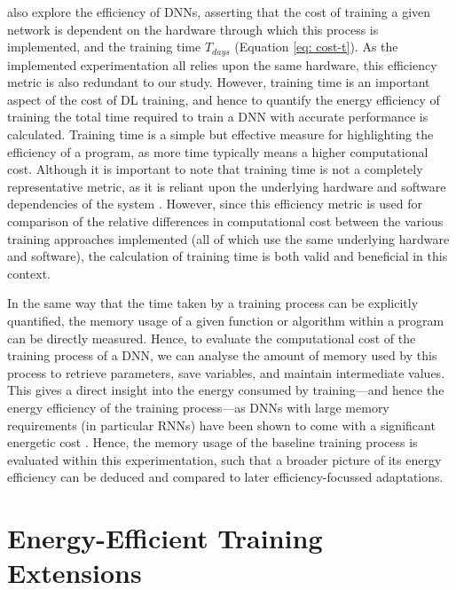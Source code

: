 \documentclass[a4paper, 11pt]{report}
\begin{document}
    \citet{amodei-2018} also explore the efficiency of DNNs, asserting that the cost of training a given network is dependent on the hardware through which this process is implemented, and the training time $T_{days}$ (Equation \ref{eq: cost-t}). As the implemented experimentation all relies upon the same hardware, this efficiency metric is also redundant to our study. However, training time is an important aspect of the cost of DL training, and hence to quantify the energy efficiency of training the total time required to train a DNN with accurate performance is calculated. Training time is a simple but effective measure for highlighting the efficiency of a program, as more time typically means a higher computational cost. Although it is important to note that training time is not a completely representative metric, as it is reliant upon the underlying hardware and software dependencies of the system \citep{schwartz-2019}. However, since this efficiency metric is used for comparison of the relative differences in computational cost between the various training approaches implemented (all of which use the same underlying hardware and software), the calculation of training time is both valid and beneficial in this context.

    In the same way that the time taken by a training process can be explicitly quantified, the memory usage of a given function or algorithm within a program can be directly measured. Hence, to evaluate the computational cost of the training process of a DNN, we can analyse the amount of memory used by this process to retrieve parameters, save variables, and maintain intermediate values. This gives a direct insight into the energy consumed by training---and hence the energy efficiency of the training process---as DNNs with large memory requirements (in particular RNNs) have been shown to come with a significant energetic cost \citep{feliz-2021}. Hence, the memory usage of the baseline training process is evaluated within this experimentation, such that a broader picture of its energy efficiency can be deduced and compared to later efficiency-focussed adaptations.


    \section{Energy-Efficient Training Extensions}
    \label{section: energy-extensions}

    
\end{document}
